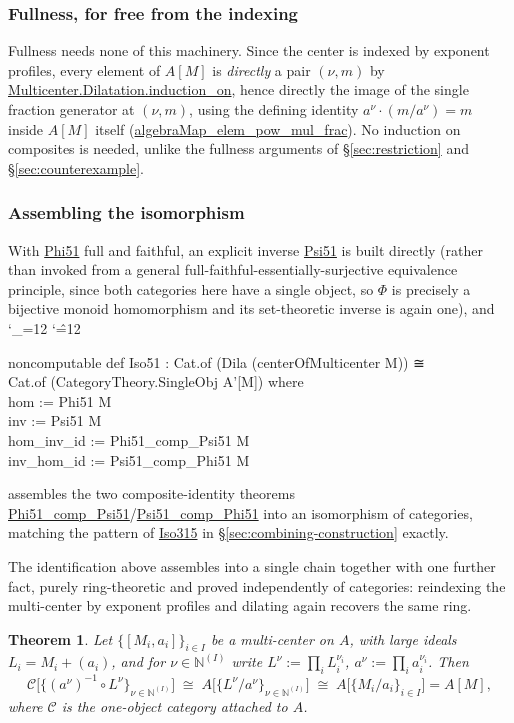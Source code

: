 \documentclass[11pt]{amsart}
\newcommand{\lc}[1]{\url{#1}}
\newenvironment{leancode}{%
  \begingroup
  \catcode`\_=12\relax
  \catcode`\^=12\relax
  \small\ttfamily\raggedright\baselineskip=1.15\baselineskip
  \par\smallskip\noindent
}{%
  \par\smallskip
  \endgroup
}
\theoremstyle{plain}
\newtheorem{theorem}{Theorem}[section]
\theoremstyle{definition}
\theoremstyle{remark}
\newcommand{\calC}{\mathcal C}
\begin{document}
\subsubsection*{Fullness, for free from the indexing}
Fullness needs none of this machinery. Since the center is indexed by exponent profiles,
every element of $A[M]$ is \emph{directly} a pair $(\nu,m)$ by
\lc{Multicenter.Dilatation.induction\_on}, hence directly the image of the single fraction
generator at $(\nu,m)$, using the defining identity $a^\nu\cdot(m/a^\nu)=m$ inside $A[M]$
itself (\lc{algebraMap\_elem\_pow\_mul\_frac}). No induction on composites is needed, unlike
the fullness arguments of \S\ref{sec:restriction} and \S\ref{sec:counterexample}.

\subsubsection*{Assembling the isomorphism}
With \lc{Phi51} full and faithful, an explicit inverse \lc{Psi51} is built directly (rather
than invoked from a general full-faithful-essentially-surjective equivalence principle, since
both categories here have a single object, so $\Phi$ is precisely a bijective monoid
homomorphism and its set-theoretic inverse is again one), and
\begin{leancode}
noncomputable def Iso51 : Cat.of (Dila (centerOfMulticenter M)) ≅ \\
    Cat.of (CategoryTheory.SingleObj A'[M]) where \\
  hom := Phi51 M \\
  inv := Psi51 M \\
  hom_inv_id := Phi51_comp_Psi51 M \\
  inv_hom_id := Psi51_comp_Phi51 M \\
\end{leancode}
assembles the two composite-identity theorems \lc{Phi51\_comp\_Psi51}/\lc{Psi51\_comp\_Phi51}
into an isomorphism of categories, matching the pattern of \lc{Iso315} in
\S\ref{sec:combining-construction} exactly.

The identification above assembles into a single chain together with one further fact, purely
ring-theoretic and proved independently of categories: reindexing the multi-center by exponent
profiles and dilating again recovers the same ring.

\begin{theorem}
\label{thm:rings-reindex}
Let $\{[M_i,a_i]\}_{i\in I}$ be a multi-center on $A$, with large ideals $L_i = M_i+(a_i)$, and
for $\nu\in\mathbb N^{(I)}$ write $L^\nu := \prod_i L_i^{\nu_i}$, $a^\nu := \prod_i a_i^{\nu_i}$.
Then
\[
\calC\big[\{(a^\nu)^{-1}\circ L^\nu\}_{\nu\in\mathbb N^{(I)}}\big] \;\cong\;
A\big[\{L^\nu/a^\nu\}_{\nu\in\mathbb N^{(I)}}\big] \;\cong\; A\big[\{M_i/a_i\}_{i\in I}\big] = A[M],
\]
where $\calC$ is the one-object category attached to $A$.
\end{theorem}
\end{document}
